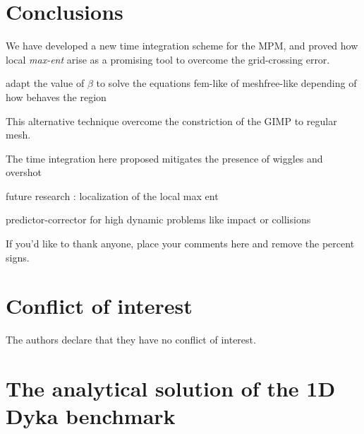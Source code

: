 \section{Conclusions}
\label{sec:conclusions}
We have developed a new time integration scheme for the MPM, and
proved how local \textit{max-ent} arise as a promising tool to
overcome the grid-crossing error.

adapt the value of $\beta$ to solve the equations fem-like of
meshfree-like depending of how behaves the region

This alternative technique overcome the constriction of the GIMP to
regular mesh.

The time integration here proposed mitigates the presence of wiggles
and overshot

future research :
localization of the local max ent

predictor-corrector for high dynamic problems like impact or
collisions 

\begin{acknowledgements}
If you'd like to thank anyone, place your comments here
and remove the percent signs.
\end{acknowledgements}

%
\section*{Conflict of interest}
%
The authors declare that they have no conflict of interest.


\appendix
\section{The analytical solution of the 1D Dyka benchmark}
\label{app:analytical_sol}

